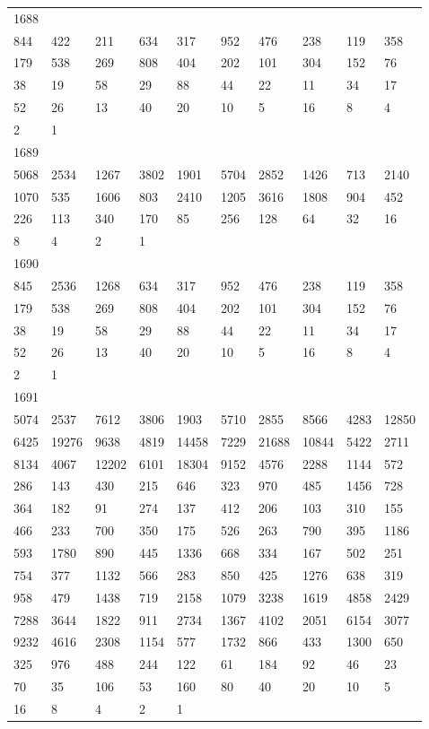 \begin{longtable}{*{10}{l}}
1688&&&&&&&&&\\
844& 422& 211& 634& 317& 952& 476& 238& 119& 358\\
179& 538& 269& 808& 404& 202& 101& 304& 152& 76\\
38& 19& 58& 29& 88& 44& 22& 11& 34& 17\\
52& 26& 13& 40& 20& 10& 5& 16& 8& 4\\
2& 1& \\

1689&&&&&&&&&\\
5068& 2534& 1267& 3802& 1901& 5704& 2852& 1426& 713& 2140\\
1070& 535& 1606& 803& 2410& 1205& 3616& 1808& 904& 452\\
226& 113& 340& 170& 85& 256& 128& 64& 32& 16\\
8& 4& 2& 1& \\

1690&&&&&&&&&\\
845& 2536& 1268& 634& 317& 952& 476& 238& 119& 358\\
179& 538& 269& 808& 404& 202& 101& 304& 152& 76\\
38& 19& 58& 29& 88& 44& 22& 11& 34& 17\\
52& 26& 13& 40& 20& 10& 5& 16& 8& 4\\
2& 1& \\

1691&&&&&&&&&\\
5074& 2537& 7612& 3806& 1903& 5710& 2855& 8566& 4283& 12850\\
6425& 19276& 9638& 4819& 14458& 7229& 21688& 10844& 5422& 2711\\
8134& 4067& 12202& 6101& 18304& 9152& 4576& 2288& 1144& 572\\
286& 143& 430& 215& 646& 323& 970& 485& 1456& 728\\
364& 182& 91& 274& 137& 412& 206& 103& 310& 155\\
466& 233& 700& 350& 175& 526& 263& 790& 395& 1186\\
593& 1780& 890& 445& 1336& 668& 334& 167& 502& 251\\
754& 377& 1132& 566& 283& 850& 425& 1276& 638& 319\\
958& 479& 1438& 719& 2158& 1079& 3238& 1619& 4858& 2429\\
7288& 3644& 1822& 911& 2734& 1367& 4102& 2051& 6154& 3077\\
9232& 4616& 2308& 1154& 577& 1732& 866& 433& 1300& 650\\
325& 976& 488& 244& 122& 61& 184& 92& 46& 23\\
70& 35& 106& 53& 160& 80& 40& 20& 10& 5\\
16& 8& 4& 2& 1& \\


\end{longtable}

